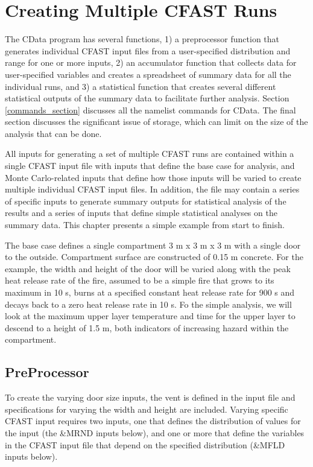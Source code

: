 \documentclass[12pt,twoside]{book}
\begin{document}
\clearpage

%
%


\chapter{Creating Multiple CFAST Runs}
The CData program has several functions, 1) a preprocessor function that generates individual CFAST input files from a user-specified distribution and range for one or more inputs, 2) an accumulator function that collects  data for user-specified variables and creates a spreadsheet of summary data for all the individual runs, and 3) a statistical function that creates several different statistical outputs of the summary data to facilitate further analysis.  Section \ref{commands_section} discusses all the namelist commands for CData. The final section discusses the significant issue of storage, which can limit on the size of the analysis that can be done.

All inputs for generating a set of multiple CFAST runs are contained within a single CFAST input file with inputs that define the base case for analysis, and Monte Carlo-related inputs that define how those inputs will be varied to create multiple individual CFAST input files. In addition, the file may contain a series of specific inputs to generate summary outputs for statistical analysis of the results and a series of inputs that define simple statistical analyses on the summary data.  This chapter presents a simple example from start to finish.

The base case defines a single compartment 3 m x 3 m x 3 m with a single door to the outside.  Compartment surface are constructed of 0.15 m concrete. For the example, the width and height of the door will be varied along with the peak heat release rate of the fire, assumed to be a simple fire that grows to its maximum in 10 s, burns at a specified constant heat release rate for 900 s and decays back to a zero heat release rate in 10 s. Fo the simple analysis, we will look at the maximum upper layer temperature and time for the upper layer to descend to a height of 1.5 m, both indicators of increasing hazard within the compartment.

\section{PreProcessor}

To create the varying door size inputs, the vent is defined in the input file and specifications for varying the width and height are included. Varying specific CFAST input requires two inputs, one that defines the distribution of values for the input (the {\ct \&MRND} inputs below), and one or more that define the variables in the CFAST input file that depend on the specified distribution ({\ct \&MFLD} inputs below).
\end{document}
